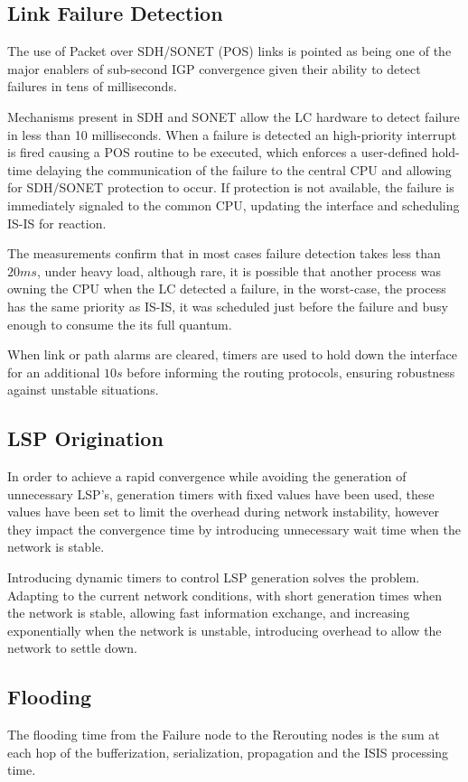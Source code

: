 \documentclass[a4paper, 11pt, UTF8]{article}
\begin{document}
\subsection{Link Failure Detection}
The use of Packet over SDH/SONET (POS) links is pointed as being one of the major enablers of sub-second IGP convergence given their ability to detect failures in tens of milliseconds.

Mechanisms present in SDH and SONET allow the LC hardware to detect failure in less than 10 milliseconds.
When a failure is detected an high-priority interrupt is fired causing a POS routine to be executed,
which enforces a user-defined hold-time delaying the communication of the failure to the central CPU and allowing for SDH/SONET protection to occur.
If protection is not available, the failure is immediately signaled to the common CPU, updating the interface and scheduling IS-IS for reaction.

The measurements confirm that in most cases failure detection takes less than $20ms$, under heavy load, 
although rare, it is possible that another process was owning the CPU when the LC detected a failure,
in the worst-case, the process has the same priority as IS-IS, 
it was scheduled just before the failure and busy enough to consume the its full quantum.

When link or path alarms are cleared, 
timers are used to hold down the interface for an additional $10s$ before informing the routing protocols, 
ensuring robustness against unstable situations.

\subsection{LSP Origination}
In order to achieve a rapid convergence while avoiding the generation of unnecessary LSP's, generation timers with fixed values have been used,
these values have been set to limit the overhead during network instability, 
however they impact the convergence time by introducing unnecessary wait time when the network is stable.

Introducing dynamic timers to control LSP generation solves the problem.
Adapting to the current network conditions, 
with short generation times when the network is stable, allowing fast information exchange,
and increasing exponentially when the network is unstable,
introducing overhead to allow the network to settle down.

\subsection{Flooding}
The flooding time from the Failure node to the Rerouting nodes is the sum at each hop of the bufferization, serialization, propagation and the ISIS processing time.
\end{document}
